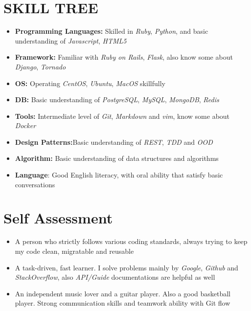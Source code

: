 \documentclass[12pt, a4paper,sans]{moderncv}     %
\begin{document}

\section{SKILL TREE}

\begin{itemize}
  \item{\textbf{Programming Languages:} {Skilled in \textit{Ruby}, \textit{Python}, and basic understanding of \textit{Javascript}, \textit{HTML5}}}%
  \item{\textbf{Framework:} {Familiar with \textit{Ruby on Rails}, \textit{Flask}, also know some about \textit{Django}, \textit{Tornado}}}%
  \item{\textbf{OS:} {Operating \textit{CentOS}, \textit{Ubuntu}, \textit{MacOS} skillfully}}%
  \item{\textbf{DB:} {Basic understanding of \textit{PostgreSQL}, \textit{MySQL}, \textit{MongoDB}, \textit{Redis}}}%
  \item{\textbf{Tools:} {Intermediate level of \textit{Git}, \textit{Markdown} and \textit{vim}, know some about \textit{Docker}}}%
  \item{\textbf{Design Patterns:}{Basic understanding of \textit{REST}, \textit{TDD} and \textit{OOD}}}%
  \item{ \textbf{Algorithm:} {Basic understanding of data structures and algorithms}}%
  \item{\textbf{Language}: {Good English literacy, with oral ability that satisfy basic conversations} }
\end{itemize}


\section{Self Assessment}

\begin{itemize}
  \item{  A person who strictly follows various coding standards, always trying to keep my code clean, migratable and reusable}
  \item{  A task-driven, fast learner. I solve problems mainly by \textit{Google}, \textit{Github} and \textit{StackOverflow}, also \textit{API/Guide} documentations are helpful as well}
  \item{  An independent music lover and a guitar player. Also a good basketball player. Strong communication skills and teamwork ability with Git flow}
\end{itemize}
\end{document}
